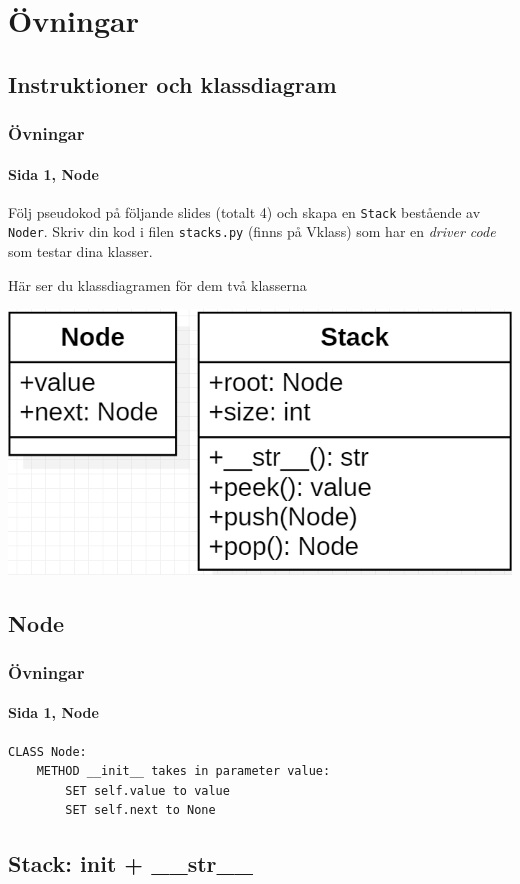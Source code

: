 \documentclass[aspectratio=169]{beamer}
\begin{document}
\section{Övningar}

\subsection{Instruktioner och klassdiagram}

\begin{frame}[fragile]
	\frametitle{Övningar}
	\framesubtitle{Sida 1, Node}
	
	Följ pseudokod på följande slides (totalt 4) och skapa en \texttt{Stack} bestående av \texttt{Noder}. Skriv din kod i filen \texttt{stacks.py} (finns på Vklass) som har en \textit{driver code} som testar dina klasser.
	
	Här ser du klassdiagramen för dem två klasserna
	
	\begin{center}
		\includegraphics[width=.5\textwidth]{stackuml.png}
	\end{center}
	
\end{frame}

\subsection{Node}

\begin{frame}[fragile]
	\frametitle{Övningar}
	\framesubtitle{Sida 1, Node}
	
	\begin{lstlisting}
CLASS Node:
    METHOD __init__ takes in parameter value:
        SET self.value to value
        SET self.next to None
	\end{lstlisting}

\end{frame}

\subsection{Stack: init + \_\_str\_\_}
\end{document}
